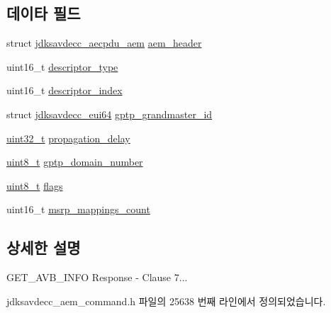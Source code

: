 \subsection*{데이타 필드}
\begin{DoxyCompactItemize}
\item 
struct \hyperlink{structjdksavdecc__aecpdu__aem}{jdksavdecc\+\_\+aecpdu\+\_\+aem} \hyperlink{structjdksavdecc__aem__command__get__avb__info__response_ae1e77ccb75ff5021ad923221eab38294}{aem\+\_\+header}
\item 
uint16\+\_\+t \hyperlink{structjdksavdecc__aem__command__get__avb__info__response_ab7c32b6c7131c13d4ea3b7ee2f09b78d}{descriptor\+\_\+type}
\item 
uint16\+\_\+t \hyperlink{structjdksavdecc__aem__command__get__avb__info__response_a042bbc76d835b82d27c1932431ee38d4}{descriptor\+\_\+index}
\item 
struct \hyperlink{structjdksavdecc__eui64}{jdksavdecc\+\_\+eui64} \hyperlink{structjdksavdecc__aem__command__get__avb__info__response_a34b9bb3bd1ced443f07d42e42d8e9704}{gptp\+\_\+grandmaster\+\_\+id}
\item 
\hyperlink{parse_8c_a6eb1e68cc391dd753bc8ce896dbb8315}{uint32\+\_\+t} \hyperlink{structjdksavdecc__aem__command__get__avb__info__response_a13e128d252d16617c804f78274446eb0}{propagation\+\_\+delay}
\item 
\hyperlink{stdint_8h_aba7bc1797add20fe3efdf37ced1182c5}{uint8\+\_\+t} \hyperlink{structjdksavdecc__aem__command__get__avb__info__response_ac53b4e61c0f960e16c86cfe678ca256d}{gptp\+\_\+domain\+\_\+number}
\item 
\hyperlink{stdint_8h_aba7bc1797add20fe3efdf37ced1182c5}{uint8\+\_\+t} \hyperlink{structjdksavdecc__aem__command__get__avb__info__response_aa2585d779da0ab21273a8d92de9a0ebe}{flags}
\item 
uint16\+\_\+t \hyperlink{structjdksavdecc__aem__command__get__avb__info__response_a837781875452b1400a0515fad392d08a}{msrp\+\_\+mappings\+\_\+count}
\end{DoxyCompactItemize}


\subsection{상세한 설명}
G\+E\+T\+\_\+\+A\+V\+B\+\_\+\+I\+N\+FO Response -\/ Clause 7... 

jdksavdecc\+\_\+aem\+\_\+command.\+h 파일의 25638 번째 라인에서 정의되었습니다.



